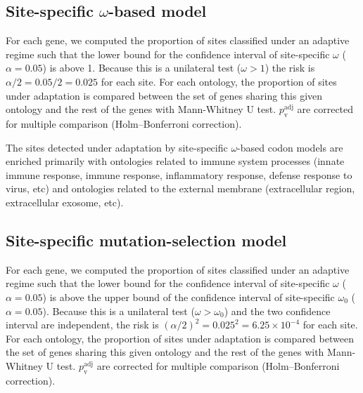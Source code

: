\documentclass{article}
\renewcommand*{\bm}[1]{#1}%
\begin{document}
    \subsection{Site-specific $\bm{\omega}$-based model}
    \label{subsec:w-based-codon-method}
    For each gene, we computed the proportion of sites classified under an adaptive regime such that the lower bound for the confidence interval of site-specific $\omega$ ($\alpha=0.05$) is above 1.
    Because this is a unilateral test ($\omega > 1$) the risk is $\alpha/2=0.05/2=0.025$ for each site.
    For each ontology, the proportion of sites under adaptation is compared between the set of genes sharing this given ontology and the rest of the genes with Mann-Whitney U test.
    $p_{\mathrm{v}}^{\mathrm{adj}}$ are corrected for multiple comparison (Holm–Bonferroni correction).

    \begin{center}
        \footnotesize
        
    \end{center}
    The sites detected under adaptation by site-specific $\omega$-based codon models are enriched primarily with ontologies related to immune system processes (innate immune response, immune response, inflammatory response, defense response to virus, etc) and ontologies related to the external membrane (extracellular region, extracellular exosome, etc).

    \subsection{Site-specific mutation-selection model}
    \label{subsec:mutation-selection-codon-method}

    For each gene, we computed the proportion of sites classified under an adaptive regime such that the lower bound for the confidence interval of site-specific $\omega$ ($\alpha=0.05$) is above the upper bound of the confidence interval of site-specific $\omega_{0}$ ($\alpha=0.05$).
    Because this is a unilateral test ($\omega > \omega_{0}$) and the two confidence interval are independent, the risk is $(\alpha/2)^2=0.025^2=6.25 \times 10^{-4}$ for each site.
    For each ontology, the proportion of sites under adaptation is compared between the set of genes sharing this given ontology and the rest of the genes with Mann-Whitney U test.
    $p_{\mathrm{v}}^{\mathrm{adj}}$ are corrected for multiple comparison (Holm–Bonferroni correction).
\end{document}
